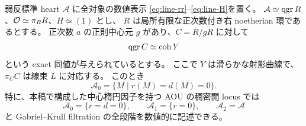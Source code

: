 \begin{proposition}[中心的曲線因子がある場合の零次元層]
\label{prop:elliptic-divisor-length-recognition}
弱反標準 heart $\mathcal A$ に全対象の数値表示
\eqref{eq:line-rr}--\eqref{eq:line-H}を置く。
$\mathcal A\simeq\operatorname{qgr} R$、$\mathcal O\simeq\pi_RR$、$H\simeq(1)$ とし、
$R$ は局所有限な正次数付き右 noetherian 環であるとする。
正次数 $a$ の正則中心元 $g$ があり、$C=R/gR$ に対して
\[
 \operatorname{qgr} C\simeq\operatorname{coh}Y
\]
という exact 同値が与えられているとする。
ここで $Y$ は滑らかな射影曲線で、$\pi_CC$ は線束 $L$ に対応する。
このとき
\[
 \mathcal A_0=\{M\mid r(M)=d(M)=0\}.
\]
特に、本稿で構成した中心楕円因子を持つ AOU の稠密開 locus では
\[
 \mathcal A_0=\{r=d=0\},\qquad
 \mathcal A_1=\{r=0\},\qquad \mathcal A_2=\mathcal A
\]
と Gabriel--Krull filtration の全段階を数値的に記述できる。
\end{proposition}
